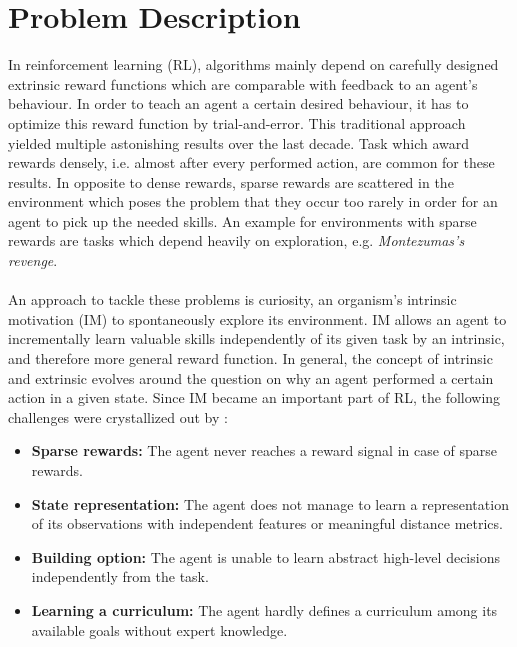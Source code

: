\documentclass[draft,final]{vutinfth} %
\begin{document}
    \section{Problem Description}
    In reinforcement learning (RL), algorithms mainly depend on carefully designed extrinsic reward functions which are comparable with feedback to an agent's behaviour.
    In order to teach an agent a certain desired behaviour, it has to optimize this reward function by trial-and-error.
    This traditional approach yielded multiple astonishing results over the last decade.
    Task which award rewards densely, i.e. almost after every performed action, are common for these results.
    In opposite to dense rewards, sparse rewards are scattered in the environment which poses the problem that they occur too rarely in order for an agent to pick up the needed skills.
    An example for environments with sparse rewards are tasks which depend heavily on exploration, e.g. \textit{Montezumas's revenge}.
    \\\\
    An approach to tackle these problems is curiosity, an organism's intrinsic motivation (IM) to spontaneously explore its environment.
    IM allows an agent to incrementally learn valuable skills independently of its given task by an intrinsic, and therefore more general reward function.
    In general, the concept of intrinsic and extrinsic evolves around the question on why an agent performed a certain action in a given state.
    Since IM became an important part of RL, the following challenges were crystallized out by \cite{aubret_survey_2019}:

    \begin{itemize}
        \item \textbf{Sparse rewards:} The agent never reaches a reward signal in case of sparse rewards.
        \item \textbf{State representation:} The agent does not manage to learn a representation of its observations with independent features or meaningful distance metrics.
        \item \textbf{Building option:} The agent is unable to learn abstract high-level decisions independently from the task.
        \item \textbf{Learning a curriculum:} The agent hardly defines a curriculum among its available goals without expert knowledge.
    \end{itemize}
\end{document}
